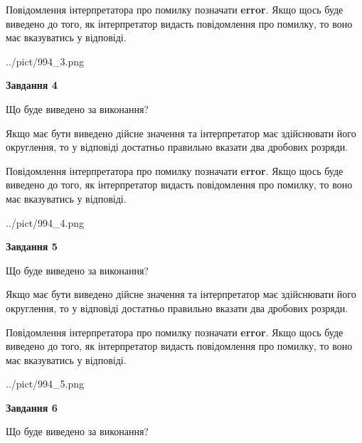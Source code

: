 \documentclass[12pt, ukrainian]{article}
\begin{document}
{\begin {Large}
Повідомлення інтерпретатора про помилку позначати \textbf{error}.
Якщо щось буде виведено до того, як інтерпретатор видасть повідомлення про помилку, 
то воно має вказуватись у відповіді. \par

\begin{center}
	{../pict/994_3.png}
\end{center}
\newpage

{\begin {center}\textbf{Завдання 4}\end {center}}\par
Що буде виведено за виконання? \par

Якщо має бути виведено дійсне значення та інтерпретатор має здійснювати його округлення, 
то у відповіді достатньо правильно вказати два дробових розряди.

Повідомлення інтерпретатора про помилку позначати \textbf{error}.
Якщо щось буде виведено до того, як інтерпретатор видасть повідомлення про помилку, 
то воно має вказуватись у відповіді. \par

\begin{center}
	{../pict/994_4.png}
\end{center}
\newpage

{\begin {center}\textbf{Завдання 5}\end {center}}\par
Що буде виведено за виконання? \par

Якщо має бути виведено дійсне значення та інтерпретатор має здійснювати його округлення, 
то у відповіді достатньо правильно вказати два дробових розряди.

Повідомлення інтерпретатора про помилку позначати \textbf{error}.
Якщо щось буде виведено до того, як інтерпретатор видасть повідомлення про помилку, 
то воно має вказуватись у відповіді. \par

\begin{center}
	{../pict/994_5.png}
\end{center}
\newpage

{\begin {center}\textbf{Завдання 6}\end {center}}\par
Що буде виведено за виконання? \par


\end{Large}}
\end{document}
